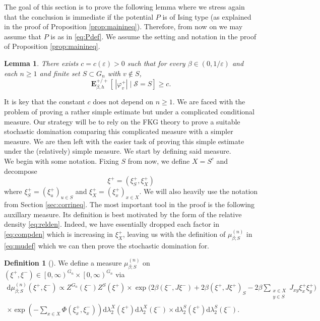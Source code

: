 \documentclass{article}
\newtheorem{lemma}[theorem]{Lemma}
\numberwithin{equation}{section}
\theoremstyle{definition}
\theoremstyle{definition}
\newtheorem{definition}{Definition}
\theoremstyle{remark}
\renewcommand{\d}{\mathrm{d}}
\newcommand{\E}{\mathbb{E}}
\newcommand\vp{\varphi}
\renewcommand{\d}{\mathrm{d}}
\renewcommand{\l}{\lambda}
\newcommand{\I}{\Phi}
\renewcommand{\E}{\mathrm{\mathbf{E}}}
\renewcommand{\L}{\xi}
\renewcommand{\S}{\mathcal{S}}
\newcommand{\eps}{\varepsilon}
\begin{document}
The goal of this section is to prove the following lemma where we stress again that the conclusion is immediate if the potential $P$ is of Ising type (as explained in the proof of Proposition \ref{prop:mainineq}).
Therefore, from now on we may assume that $P$ is as in \eqref{eq:Pdef}. 
We assume the setting and notation in the proof of Proposition \ref{prop:mainineq}. 
\begin{lemma}\label{lemma:technical}
	There exists $c = c(\eps) > 0$ such that for every $\beta \in (0,1/\eps)$ and each $n \geq 1$ and finite set $S \subset G_n$ with $v \not\in S$, 
	\[
		\E^{+ / +}_{\beta,h}\left[ \, |\vp^+_v| \mid \S = S \right] \geq c.
	\]
\end{lemma}
It is key that the constant $c$ does not depend on $n \geq 1$. We are faced with the problem of proving a rather simple estimate but under a complicated conditional measure. Our strategy will be to rely on the FKG theory to prove a suitable stochastic domination comparing this complicated measure with a simpler measure. We are then left with the easier task of proving this simple estimate under the (relatively) simple measure. We start by defining said measure.
\\[1em]
\noindent We begin with some notation. Fixing $S$ from now, we define $X = S^c$ and decompose
\[
\L^+ = (\L^+_S,\L^+_X)
\] 
where $\L^+_S = (\L^+_u)_{u \in S}$ and $\L^+_{X} = (\L^+_x)_{x \in X}$. We will also heavily use the notation from Section \ref{sec:corrineq}.
The most important tool in the proof is the following auxillary measure. Its definition is best motivated by the form of the relative density \eqref{eq:relden}. Indeed, we have essentially dropped each factor in \eqref{eq:compden} which is increasing in $\L^+_X$, leaving us with the definition of $\mu_{\beta;S}^{(n)}$ in \eqref{eq:mudef} which we can then prove the stochastic domination for.
\begin{definition}[]
	We define a measure $\mu_{\beta;S}^{(n)}$ on $(\L^+,\L^-) \in \left[0,\infty \right)^{G_n} \times \left[ 0,\infty \right)^{G_n}$ via
	\begin{multline}\label{eq:mudef}
		\d\mu_{\beta;S}^{(n)}(\xi^+,\xi^-) \propto Z^{G_n}(\L^-)  Z^{S}(\L^+) \times \exp\Big( 2\beta(\L^-,J\L^-) + 2\beta(\L^+,J\L^+)_S - 2\beta \sum_{\substack{x \in X \\ y \in S}} J_{xy} \L^+_x \L^+_y\Big) \\ \times \exp(- \textstyle\sum_{x \in X}\I(\L^+_x,\L^-_x)) \d\l_2^X(\L^+) \d\l_2^X(\L^-) \times \d\l_2^S(\L^+)\d\l_2^S(\L^-).
	\end{multline} 
\end{definition}
\end{document}
